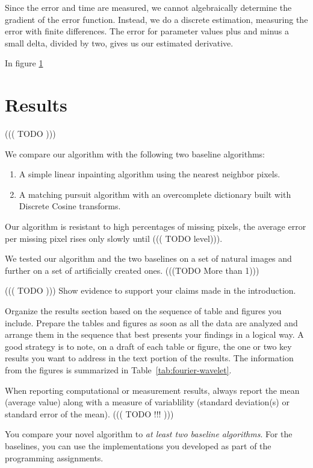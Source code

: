 \documentclass[10pt,conference,compsocconf]{IEEEtran}
\begin{document}
Since the error and time are measured, we cannot algebraically determine the gradient of the error function. Instead, we do a discrete estimation,
measuring the error with finite differences. The error for parameter values plus and minus a small delta, divided by two, gives us our estimated
derivative.

In figure \ref{}

\section{Results}

 ((( TODO )))
 
 We compare our algorithm with the following two baseline algorithms:
 \begin{enumerate}
	 \item A simple linear inpainting algorithm using the nearest neighbor pixels.
	 \item A matching pursuit algorithm \cite{matchingpursuit93} with an overcomplete dictionary built with Discrete Cosine transforms.
 \end{enumerate}
 
  Our algorithm is resistant to high percentages of missing pixels, the average error per missing pixel rises only slowly until ((( TODO level))). 
 
 We tested our algorithm and the two baselines on a set of natural images and further on a set of artificially created ones. (((TODO More than 1))) 
 
 ((( TODO )))
  Show evidence to support your claims made in the
  introduction. 
  
Organize the results section based on the sequence of table and
figures you include. Prepare the tables and figures as soon as all
the data are analyzed and arrange them in the sequence that best
presents your findings in a logical way. A good strategy is to note,
on a draft of each table or figure, the one or two key results you
want to address in the text portion of the results.
The information from the figures is
summarized in Table~\ref{tab:fourier-wavelet}.

When reporting computational or measurement results, always
report the mean (average value) along with a measure of variablility
(standard deviation(s) or standard error of the mean). ((( TODO !!! )))

You compare your novel algorithm to \emph{at least two baseline
  algorithms}. For the baselines, you can use the implementations you
developed as part of the programming assignments.
\end{document}
